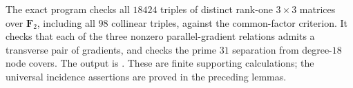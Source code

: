 \begin{remark}
The exact program
checks all $18424$ triples of distinct rank-one $3\times3$
matrices over $\mathbf F_2$, including all $98$ collinear
triples, against the common-factor criterion. It checks that
each of the three nonzero parallel-gradient relations admits
a transverse pair of gradients, and checks the prime $31$
separation from degree-$18$ node covers. The output is
.
These are finite supporting calculations; the universal
incidence assertions are proved in the preceding lemmas.
\end{remark}
